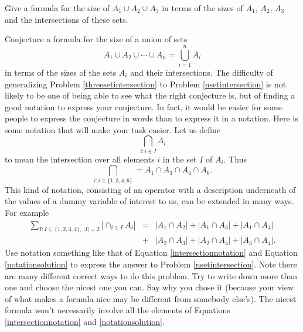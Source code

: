 \iteme Give a formula for the size of $A_1\cup A_2\cup A_3$ in terms of
the sizes of $A_1$, $A_2$, $A_3$ and the intersections of these
sets.\label{threesetintersection}

\iteme Conjecture a formula for the size of a union of sets $$A_1\cup
A_2\cup \cdots\cup A_n = \bigcup_{i=1}^n A_i$$ in terms of the sizes of
the sets $A_i$ and their intersections.\label{nsetintersection}
\ep
The difficulty of generalizing Problem \ref{threesetintersection} to
Problem \ref{nsetintersection} is not likely to be one of being able to
see what the right conjecture is, but of finding a good notation to
express your conjecture.  In fact, it would be easier for some people to
express the conjecture in words than to express it in a notation. Here
is some notation that will make your task easier.  Let us define
$$\bigcap_{i:i\in I}A_i$$ to mean the intersection over all elements $i$
in the set $I$ of
$A_i$.  Thus
  \begin{equation}
\bigcap_{i:i\in
\{1,3,4,6\}} = A_1\cap A_3\cap A_4 \cap A_6.\label{intersectionnotation}
  \end{equation}
This kind of notation, consisting of an operator with a description
underneath of the values of a dummy variable of interest to us, can be
extended in many ways.  For example
\begin{eqnarray}\sum_{I:I \subseteq \{1,2,3,4\}, \ |I|=2} |\cap_{i\in I}
A_i| &=& |A_1\cap A_2|+ |A_1\cap A_3|
 +|A_1\cap A_4|\nonumber\\ &+& |A_2\cap A_3|+
|A_2\cap A_4| +|A_3\cap A_4|.\label{notationsolution}
\end{eqnarray}
  \bp
 \iteme Use notation something like that of Equation
\ref{intersectionnotation} and Equation \ref{notationsolution} to express
the answer to Problem \ref{nsetintersection}.  Note there are many
different correct ways to do this problem.  Try to write down  more
than one and choose the nicest one you can.  Say why you chose it
(because your view of what makes a formula nice may be different from
somebody else's).  The nicest formula won't necessarily involve all the
elements of Equations
\ref{intersectionnotation} and 
\ref{notationsolution}.\label{inclusion-exclusionunion}
